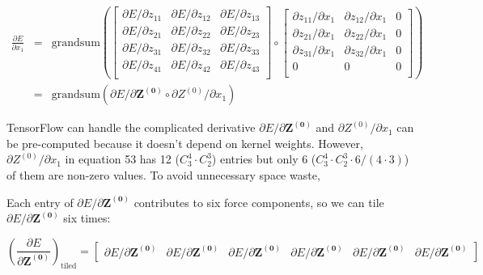 \documentclass{article}
\begin{document}
\begin{eqnarray}
\frac{\partial{E}}{\partial{x_1}} 
& = & 
\mathrm{grandsum}\left(
	\left[\begin{array}{ccc}
		\partial{E} / \partial{z_{11}} & 
		\partial{E} / \partial{z_{12}} &
		\partial{E} / \partial{z_{13}} \\ 
		\partial{E} / \partial{z_{21}} &
		\partial{E} / \partial{z_{22}} &
		\partial{E} / \partial{z_{23}} \\
		\partial{E} / \partial{z_{31}} &
		\partial{E} / \partial{z_{32}} &
		\partial{E} / \partial{z_{33}} \\
		\partial{E} / \partial{z_{41}} &
		\partial{E} / \partial{z_{42}} &
		\partial{E} / \partial{z_{43}} \\
		\end{array}
	\right] 
	\circ 
	\left[\begin{array}{ccc}
		\partial{z_{11}} / \partial{x_1} & 
		\partial{z_{12}} / \partial{x_1} &
		0 \\ 
		\partial{z_{21}} / \partial{x_1} &
		\partial{z_{22}} / \partial{x_1} &
		0 \\
		\partial{z_{31}} / \partial{x_1} &
		\partial{z_{32}} / \partial{x_1} &
		0 \\
		0 &
		0 &
		0 \\	
		\end{array}
	\right]
\right) \\
& = &
\mathrm{grandsum}\left(
	\partial{E} / \partial{\mathbf{Z^{(0)}}} 
	\circ
	\partial{Z^{(0)}} / \partial{x_1}
\right)
\end{eqnarray}

\noindent TensorFlow can handle the complicated derivative 
$\partial{E} / \partial{\mathbf{Z^{(0)}}}$ and $\partial{Z^{(0)}} / \partial{x_1}$ can be
pre-computed because it doesn't depend on kernel weights. However, 
$\partial{Z^{(0)}} / \partial{x_1}$ in equation 53 has 12 ($C^4_3 \cdot C^3_2$) 
entries but only 6 ($C^4_3 \cdot C^3_2 \cdot 6 / (4 \cdot 3)$) of them are non-zero values. 
To avoid unnecessary space waste, 

Each entry of $\partial{E} / \partial{\mathbf{Z^{(0)}}}$ contributes to 
six force components, so we can tile $\partial{E} / \partial{\mathbf{Z^{(0)}}}$ six times:

\begin{equation}
\left(\frac{\partial{E}}{\partial{\mathbf{Z^{(0)}}}}\right)_{\mathrm{tiled}} = 
\left[\begin{array}{cccccc}
\partial{E} / \partial{\mathbf{Z^{(0)}}} & \partial{E} / \partial{\mathbf{Z^{(0)}}} &
\partial{E} / \partial{\mathbf{Z^{(0)}}} & \partial{E} / \partial{\mathbf{Z^{(0)}}} &
\partial{E} / \partial{\mathbf{Z^{(0)}}} & \partial{E} / \partial{\mathbf{Z^{(0)}}} 
\end{array}
\right]
\end{equation}
\end{document}
